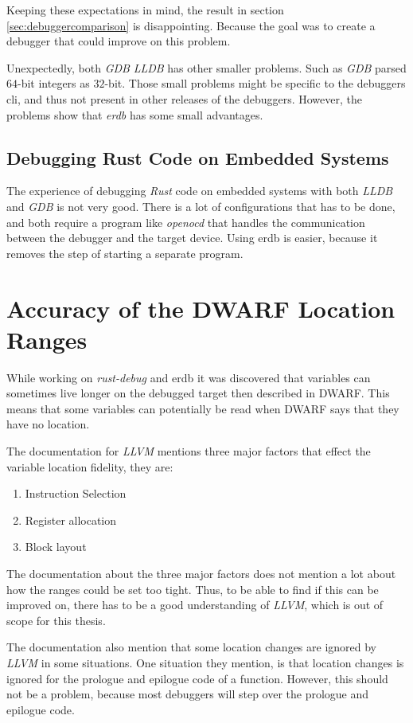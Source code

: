 Keeping these expectations in mind, the result in section \ref{sec:debuggercomparison} is disappointing.
Because the goal was to create a debugger that could improve on this problem.


Unexpectedly, both \emph{GDB} \emph{LLDB} has other smaller problems.
Such as \emph{GDB} parsed $64$-bit integers as $32$-bit.
Those small problems might be specific to the debuggers \gls{cli}, and thus not present in other releases of the debuggers.
However, the problems show that \emph{erdb} has some small advantages.


\subsection{Debugging Rust Code on Embedded Systems}
The experience of debugging \emph{Rust} code on embedded systems with both \emph{LLDB} and \emph{GDB} is not very good.
There is a lot of configurations that has to be done, and both require a program like \emph{openocd} that handles the communication between the debugger and the target device.
Using \gls{erdb} is easier, because it removes the step of starting a separate program.


\section{Accuracy of the DWARF Location Ranges}\label{section:loc-ranges}
While working on \emph{rust-debug} and \gls{erdb} it was discovered that variables can sometimes live longer on the debugged target then described in \gls{DWARF}.
This means that some variables can potentially be read when \gls{DWARF} says that they have no location.


The documentation for \emph{LLVM} \cite{llvm-dbs} mentions three major factors that effect the variable location fidelity, they are:

\begin{enumerate}
  \item Instruction Selection
  \item Register allocation
  \item Block layout
\end{enumerate}

The documentation about the three major factors does not mention a lot about how the ranges could be set too tight.
Thus, to be able to find if this can be improved on, there has to be a good understanding of \emph{LLVM}, which is out of scope for this thesis.


The documentation also mention that some location changes are ignored by \emph{LLVM} in some situations.
One situation they mention, is that location changes is ignored for the prologue and epilogue code of a function.
However, this should not be a problem, because most debuggers will step over the prologue and epilogue code.

